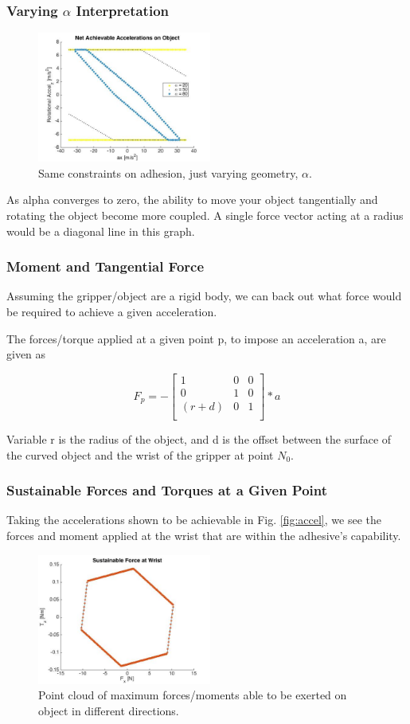\documentclass{beamer}
\begin{document}
\frame
{
\frametitle{ Varying $\alpha$ Interpretation}


\begin{figure}[htb]
	\centering
	\includegraphics[width=2.25in]{images/VaryingAlpha.jpg}
	\caption{Same constraints on adhesion, just varying geometry, $\alpha$.}
\end{figure}
	
	As alpha converges to zero, the ability to move your object tangentially and rotating the object become more coupled. A single force vector acting at a radius would be a diagonal line in this graph. 
}


\frame
{
\frametitle{ Moment and Tangential Force  }

Assuming the gripper/object are a rigid body, we can back out what force would be required to achieve a given acceleration.

The forces/torque applied at a given point p, to impose an acceleration a, are given as

\begin{equation}
F_{p} = 
  -\begin{bmatrix}
    1 & 0 & 0 \\
    0 & 1 & 0 \\
    (r+d) & 0 & 1 \\
  \end{bmatrix}
* a
\end{equation}

Variable r is the radius of the object, and d is the offset between the surface of the curved object and the wrist of the gripper at point $N_{0}$. 
	
}


\frame
{
\frametitle{ Sustainable Forces and Torques at a Given Point}

Taking the accelerations shown to be achievable in Fig. \ref{fig:accel}, we see the forces and moment applied at the wrist that are within the adhesive's capability. 

\begin{figure}[htb]
	\centering
	\includegraphics[width=2.25in]{images/FxMzForces.jpg}
	\caption{Point cloud of maximum forces/moments able to be exerted on object in different directions.}
\end{figure}
	
}
\end{document}
